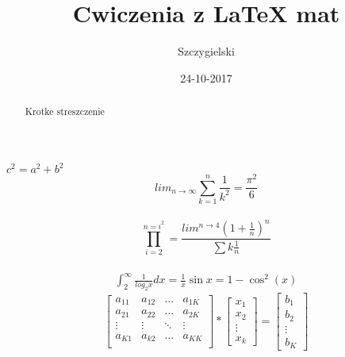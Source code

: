 \documentclass[a4paper,12pt]{article}
\begin{document}
\title{Cwiczenia z LaTeX mat}
\author{Szczygielski}
\date {24-10-2017}
\maketitle
\begin {abstract} {Krotke streszczenie}
\end {abstract}
$c^{2}=a^{2}+b^{2}$\\
$$lim_{n \to \infty}
\sum_{k=1}^n \frac{1}{k^2}
= \frac{\pi^2}{6}$$\\
$$\prod_{i=2}^{n=i^2} =\frac{lim^{n \to {4}}(1+\frac{1}{n})^n}{\sum k\frac{1}{n}}$$\\
\begin {eqnarray}
\int_{2}^{\infty} \frac{1}{log_{2}x}dx=\frac{1}{x}\sin x=1 - \cos^2(x)
\end {eqnarray}
$$\left[ \begin{array}{cccc}
a_{11} & a_{12} & \ldots & a_{1K}\\
a_{21} & a_{22} & \ldots & a_{2K}\\
\vdots & \vdots & \ddots & \vdots\\
a_{K1} & a_{k2} & \ldots & a_{KK}\\
\end {array} \right] *\left[\begin{array}{c}
x_{1}\\
x_{2}\\
\vdots\\
x_{k}
\end{array} \right]= \left[ \begin {array}{c}
b_{1}\\
b_{2}\\
\vdots\\
b_{K}
\end {array} \right]
$$
\end{document}
